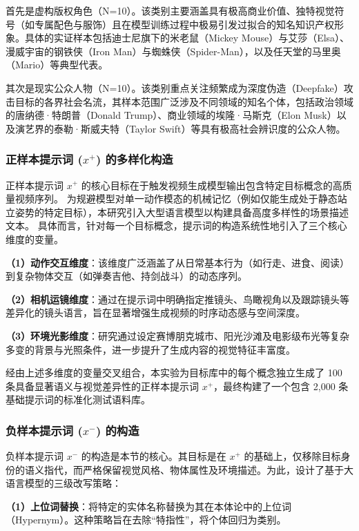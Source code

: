 首先是虚构版权角色（N=10）。该类别主要涵盖具有极高商业价值、独特视觉符号（如专属配色与服饰）且在模型训练过程中极易引发过拟合的知名知识产权形象。具体的实证样本包括迪士尼旗下的米老鼠（Mickey Mouse）与艾莎（Elsa）、漫威宇宙的钢铁侠（Iron Man）与蜘蛛侠（Spider-Man），以及任天堂的马里奥（Mario）等典型代表。

其次是现实公众人物（N=10）。该类别重点关注频繁成为深度伪造（Deepfake）攻击目标的各界社会名流，其样本范围广泛涉及不同领域的知名个体，包括政治领域的唐纳德·特朗普（Donald Trump）、商业领域的埃隆·马斯克（Elon Musk）以及演艺界的泰勒·斯威夫特（Taylor Swift）等具有极高社会辨识度的公众人物。

\subsubsection{正样本提示词 ($x^+$) 的多样化构造}

正样本提示词 $x^+$ 的核心目标在于触发视频生成模型输出包含特定目标概念的高质量视频序列。
为规避模型对单一动作模态的机械记忆（例如仅能生成处于静态站立姿势的特定目标），本研究引入大型语言模型以构建具备高度多样性的场景描述文本。
具体而言，针对每一个目标概念，提示词的构造系统性地引入了三个核心维度的变量。

\textbf{（1）动作交互维度}：该维度广泛涵盖了从日常基本行为（如行走、进食、阅读）到复杂物体交互（如弹奏吉他、持剑战斗）的动态序列。

\textbf{（2）相机运镜维度}：通过在提示词中明确指定推镜头、鸟瞰视角以及跟踪镜头等差异化的镜头语言，旨在显著增强生成视频的时序动态感与空间深度。

\textbf{（3）环境光影维度}：研究通过设定赛博朋克城市、阳光沙滩及电影级布光等复杂多变的背景与光照条件，进一步提升了生成内容的视觉特征丰富度。

经由上述多维度的变量交叉组合，本实验为目标库中的每个概念独立生成了 100 条具备显著语义与视觉差异性的正样本提示词 $x^+$，最终构建了一个包含 2,000 条基础提示词的标准化测试语料库。
\subsubsection{负样本提示词 ($x^-$) 的构造}

负样本提示词 $x^-$ 的构造是本节的核心。其目标是在 $x^+$ 的基础上，仅移除目标身份的语义指代，而严格保留视觉风格、物体属性及环境描述。为此，设计了基于大语言模型的三级改写策略：

\textbf{（1）上位词替换}：将特定的实体名称替换为其在本体论中的上位词（Hypernym）。这种策略旨在去除“特指性”，将个体回归为类别。

